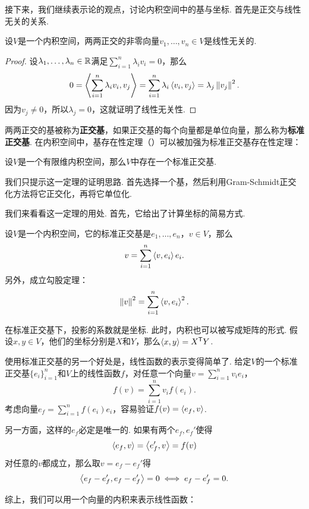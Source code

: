 接下来，我们继续表示论的观点，讨论内积空间中的基与坐标. 首先是正交与线性无关的关系. 

\begin{proposition}\label{prop:orthogonal}
设$V$是一个内积空间，两两正交的非零向量$v_1,\dots,v_n\in V$是线性无关的. 
\end{proposition}
\begin{proof}
设$\lambda_1,\dots,\lambda_n\in\mathbb{R}$满足$\sum_{i=1}^n\lambda_iv_i=0$，那么
\[
    0=\left\langle{\sum_{i=1}^n\lambda_iv_i},{v_j}\right\rangle=\sum_{i=1}^n\lambda_i\left\langle{v_i},{v_j}\right\rangle=\lambda_j\left\|v_j\right\|^2.
\]
因为$v_j\neq 0$，所以$\lambda_j=0$，这就证明了线性无关性. 
\end{proof}

两两正交的基被称为\textbf{正交基}，如果正交基的每个向量都是单位向量，那么称为\textbf{标准正交基}. 在内积空间中，基存在性定理（）可以被加强为标准正交基存在性定理：

\begin{theorem}[标准正交基存在性定理]\label{thm:orthogonal-basis}
设$V$是一个有限维内积空间，那么$V$中存在一个标准正交基. 
\end{theorem}

我们只提示这一定理的证明思路. 首先选择一个基，然后利用Gram-Schmidt正交化方法将它正交化，再将它单位化. 

我们来看看这一定理的用处. 首先，它给出了计算坐标的简易方式. 

\begin{proposition}\label{prop:projection}
设$V$是一个内积空间，它的标准正交基是$e_1,\dots,e_n$，$v\in V$，那么
\[
    v=\sum_{i=1}^n\left\langle{v},{e_i}\right\rangle e_i.
\]
另外，成立勾股定理：
\[
    \left\|v\right\|^2=\sum_{i=1}^n\left\langle{v},{e_i}\right\rangle^2.
\]
\end{proposition}

在标准正交基下，投影的系数就是坐标. 此时，内积也可以被写成矩阵的形式. 假设$x,y\in V$，他们的坐标分别是$X$和$Y$，那么$\left\langle{x},{y}\right\rangle=X^{\mathsf{T}} Y$.

使用标准正交基的另一个好处是，线性函数的表示变得简单了. 给定$V$的一个标准正交基$\{e_i\}_{i=1}^n$和$V$上的线性函数$f$，对任意一个向量$v=\sum_{i=1}^nv_ie_i$，
\[f(v)=\sum_{i=1}^nv_if(e_i).\]
考虑向量$e_f=\sum_{i=1}^nf(e_i)e_i$，容易验证$f(v)=\left\langle{e_f},{v}\right\rangle$. 

另一方面，这样的$e_f$必定是唯一的. 如果有两个$e_f,e_f'$使得
\[\left\langle{e_f},{v}\right\rangle=\left\langle{e_f'},{v}\right\rangle=f(v)\]
对任意的$v$都成立，那么取$v=e_f-e_f'$得
\[\left\langle{e_f-e_f'},{e_f-e_f'}\right\rangle=0\iff e_f-e_f'=0.\]

综上，我们可以用一个向量的内积来表示线性函数：

